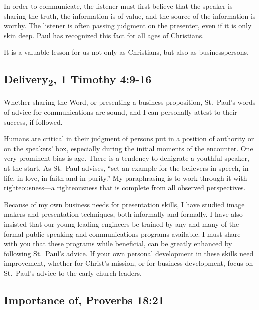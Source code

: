 \documentclass[12pt]{memoir}
\begin{document}
In order to communicate, the listener must first believe that the
speaker is sharing the truth, the information is of value, and the
source of the information is worthy. The listener is often passing
judgment on the presenter, even if it is only skin deep.
Paul
has recognized this fact for all ages of Christians.

It is a valuable lesson for us not only as Christians, but also as
businesspersons.

\subsection[Delivery\textsubscript{2}]{Delivery\textsubscript{2}, 1 Timothy 4:9-16}

Whether sharing the Word, or presenting a business proposition, St.~Paul's words of advice for communications are sound, and I can personally attest to their success, if followed.

Humans are critical in their judgment of persons put in a position
of authority or on the speakers' box, especially during the
initial moments of the encounter. One very prominent bias is age.
There is a tendency to denigrate a youthful speaker, at the start.
As St.~Paul advises, ``set an example for the believers in speech, in life, in love, in faith and in purity.'' My paraphrasing is to
work through it with righteousness---a righteousness that is complete from all observed perspectives.

Because of my own business needs for presentation skills, I have studied
image makers and presentation techniques, both informally and
formally. I have also insisted that our young leading engineers be trained by any and many of the formal public speaking and communications programs available. I must share with you that these programs while beneficial, can be greatly enhanced by following St.~Paul's advice.
If your own personal development in these skills need
improvement, whether for Christ's mission, or for business development,
focus on St.~Paul's advice to the early church leaders.

\subsection[Importance of]{Importance of, Proverbs 18:21}
\end{document}
